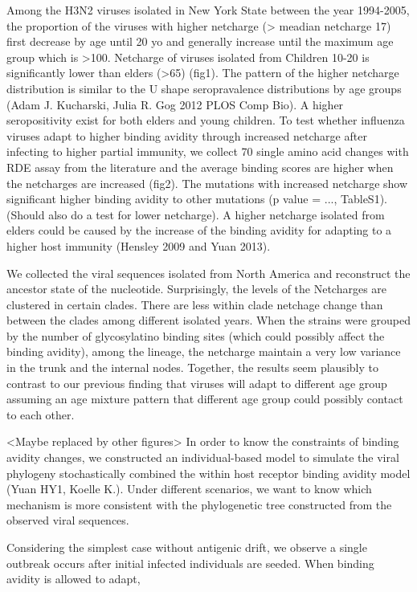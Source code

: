 \documentclass[12pt,a4paper]{article}
\begin{document}
Among the H3N2 viruses isolated in New York State between the year 1994-2005, the proportion of the viruses with higher netcharge (> meadian netcharge 17) first decrease by age until 20 yo and generally increase until the maximum age group which is >100. Netcharge of viruses isolated from Children 10-20 is significantly lower than elders (>65) (fig1). The pattern of the higher netcharge distribution is similar to the U shape seropravalence distributions by age groups (Adam J. Kucharski,  Julia R. Gog 2012 PLOS Comp Bio). A higher seropositivity exist for both elders and young children. To test whether influenza viruses adapt to higher binding avidity through increased netcharge after infecting to higher partial immunity, we collect 70 single amino acid changes with RDE assay from the literature and the average binding scores are higher when the netcharges are increased (fig2). The mutations with increased netcharge show significant higher binding avidity to other mutations (p value = ..., TableS1). (Should also do a test for lower netcharge). A higher netcharge isolated from elders could be caused by the increase of the binding avidity for adapting to a higher host immunity (Hensley 2009 and Yuan 2013).   


We collected the viral sequences isolated from North America and reconstruct the ancestor state of the nucleotide. Surprisingly, the levels of the Netcharges are clustered in certain clades. There are less within clade netchage change than between the clades among different isolated years. When the strains were grouped by the number of glycosylatino binding sites (which could possibly affect the binding avidity), among the lineage, the netcharge maintain a very low variance in the trunk and the internal nodes. Together, the results seem plausibly to contrast to our previous finding that viruses will adapt to different age group assuming an age mixture pattern that different age group could possibly contact to each other. 

 
<Maybe replaced by other figures>
In order to know the constraints of binding avidity changes, we constructed an individual-based model to simulate the viral phylogeny stochastically combined the within host receptor binding avidity model (Yuan HY1, Koelle K.). Under different scenarios, we want to know which mechanism is more consistent with the phylogenetic tree constructed from the observed viral sequences.

Considering the simplest case without antigenic drift, we observe a single outbreak occurs after initial infected individuals are seeded. When binding avidity is allowed to adapt,    
\end{document}
